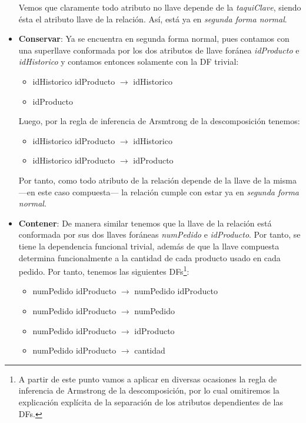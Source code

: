 \documentclass[11pt,letterpaper]{article}
\begin{document}
\begin{itemize}
Vemos que claramente todo atributo no llave depende de la \textit{taquiClave}, siendo ésta el atributo llave de la relación. Así, está ya en \textit{segunda forma normal}.
\item \textbf{Conservar}: Ya se encuentra en segunda forma normal, pues contamos con una superllave conformada por los dos atributos de llave foránea \textit{idProducto} e \textit{idHistorico} y contamos entonces solamente con la DF trivial:

\begin{itemize}
\item idHistorico idProducto $\rightarrow$ idHistorico \item idProducto
\end{itemize}

Luego, por la regla de inferencia de Arsmtrong de la descomposición tenemos:

\begin{itemize}
\item idHistorico idProducto $\rightarrow$ idHistorico\\
\item idHistorico idProducto $\rightarrow$ idProducto
\end{itemize}


Por tanto, como todo atributo de la relación depende de la llave de la misma ---en este caso compuesta--- la relación cumple con estar ya en \textit{segunda forma normal}.
\item \textbf{Contener}: De manera similar tenemos que la llave de la relación está conformada por sus dos llaves foráneas \textit{numPedido} e \textit{idProducto}. Por tanto, se tiene la dependencia funcional trivial, además de que la llave compuesta determina funcionalmente a la cantidad de cada producto usado en cada pedido. Por tanto, tenemos las siguientes DFs\footnote{A partir de este punto vamos a aplicar en diversas ocasiones la regla de inferencia de Armstrong de la descomposición, por lo cual omitiremos la explicación explícita de la separación de los atributos dependientes de las DFs.}:

\begin{itemize}
\item numPedido idProducto $\rightarrow$ numPedido idProducto

\item numPedido idProducto $\rightarrow$ numPedido
\item numPedido idProducto $\rightarrow$ idProducto
\item numPedido idProducto $\rightarrow$ cantidad
\end{itemize}


\end{itemize}
\end{document}
